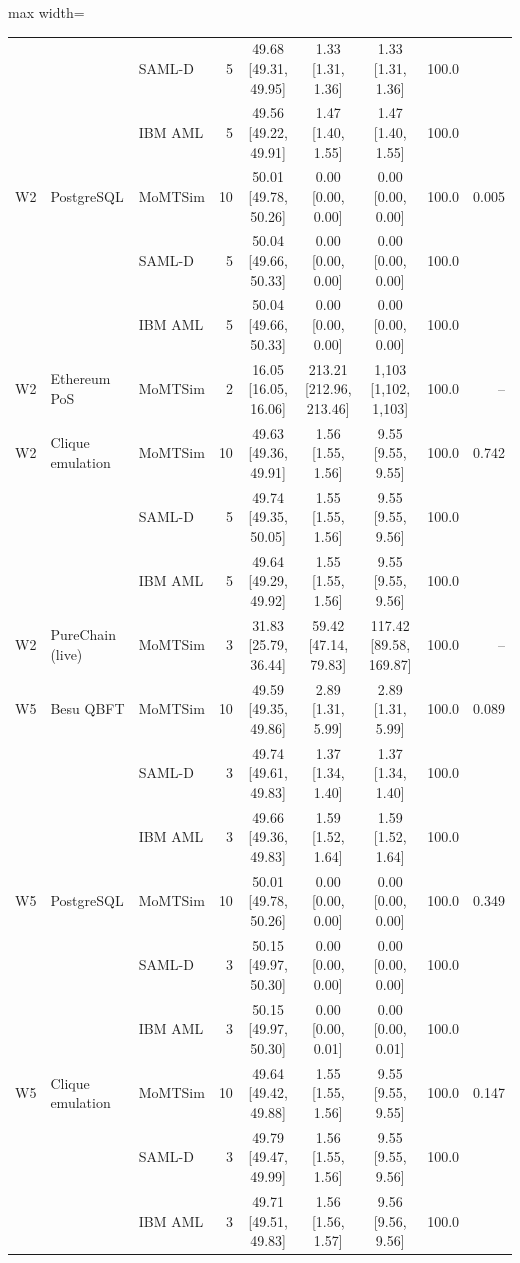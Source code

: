 \begin{table}[t]
\begin{adjustbox}{max width=\textwidth}
\begin{tabular}{lllrcccrr}
 &  & SAML-D & 5 & 49.68 [49.31, 49.95] & 1.33 [1.31, 1.36] & 1.33 [1.31, 1.36] & 100.0 &  \\
 &  & IBM AML & 5 & 49.56 [49.22, 49.91] & 1.47 [1.40, 1.55] & 1.47 [1.40, 1.55] & 100.0 &  \\
W2 & PostgreSQL & MoMTSim & 10 & 50.01 [49.78, 50.26] & 0.00 [0.00, 0.00] & 0.00 [0.00, 0.00] & 100.0 & 0.005 \\
 &  & SAML-D & 5 & 50.04 [49.66, 50.33] & 0.00 [0.00, 0.00] & 0.00 [0.00, 0.00] & 100.0 &  \\
 &  & IBM AML & 5 & 50.04 [49.66, 50.33] & 0.00 [0.00, 0.00] & 0.00 [0.00, 0.00] & 100.0 &  \\
W2 & Ethereum PoS & MoMTSim & 2 & 16.05 [16.05, 16.06] & 213.21 [212.96, 213.46] & 1,103 [1,102, 1,103] & 100.0 & -- \\
W2 & Clique emulation & MoMTSim & 10 & 49.63 [49.36, 49.91] & 1.56 [1.55, 1.56] & 9.55 [9.55, 9.55] & 100.0 & 0.742 \\
 &  & SAML-D & 5 & 49.74 [49.35, 50.05] & 1.55 [1.55, 1.56] & 9.55 [9.55, 9.56] & 100.0 &  \\
 &  & IBM AML & 5 & 49.64 [49.29, 49.92] & 1.55 [1.55, 1.56] & 9.55 [9.55, 9.56] & 100.0 &  \\
W2 & PureChain (live) & MoMTSim & 3 & 31.83 [25.79, 36.44] & 59.42 [47.14, 79.83] & 117.42 [89.58, 169.87] & 100.0 & -- \\
W5 & Besu QBFT & MoMTSim & 10 & 49.59 [49.35, 49.86] & 2.89 [1.31, 5.99] & 2.89 [1.31, 5.99] & 100.0 & 0.089 \\
 &  & SAML-D & 3 & 49.74 [49.61, 49.83] & 1.37 [1.34, 1.40] & 1.37 [1.34, 1.40] & 100.0 &  \\
 &  & IBM AML & 3 & 49.66 [49.36, 49.83] & 1.59 [1.52, 1.64] & 1.59 [1.52, 1.64] & 100.0 &  \\
W5 & PostgreSQL & MoMTSim & 10 & 50.01 [49.78, 50.26] & 0.00 [0.00, 0.00] & 0.00 [0.00, 0.00] & 100.0 & 0.349 \\
 &  & SAML-D & 3 & 50.15 [49.97, 50.30] & 0.00 [0.00, 0.00] & 0.00 [0.00, 0.00] & 100.0 &  \\
 &  & IBM AML & 3 & 50.15 [49.97, 50.30] & 0.00 [0.00, 0.01] & 0.00 [0.00, 0.01] & 100.0 &  \\
W5 & Clique emulation & MoMTSim & 10 & 49.64 [49.42, 49.88] & 1.55 [1.55, 1.56] & 9.55 [9.55, 9.55] & 100.0 & 0.147 \\
 &  & SAML-D & 3 & 49.79 [49.47, 49.99] & 1.56 [1.55, 1.56] & 9.55 [9.55, 9.56] & 100.0 &  \\
 &  & IBM AML & 3 & 49.71 [49.51, 49.83] & 1.56 [1.56, 1.57] & 9.56 [9.56, 9.56] & 100.0 &  \\
\bottomrule
\end{tabular}\end{adjustbox}
\end{table}
